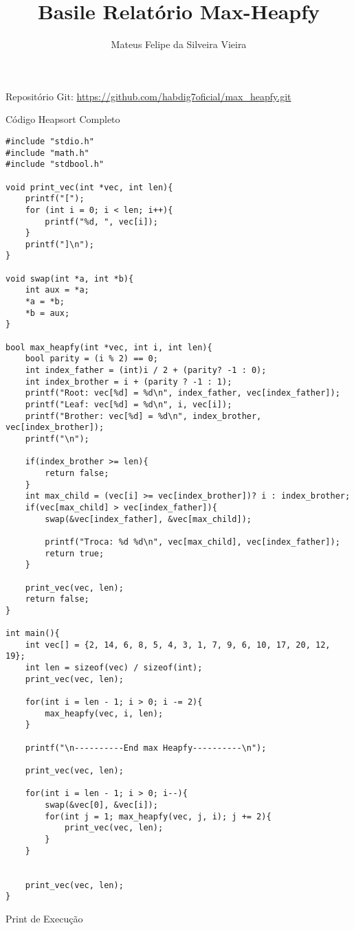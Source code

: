 \documentclass{article}
\title{Basile Relatório Max-Heapfy}
\author{Mateus Felipe da Silveira Vieira}
\begin{document}
    \maketitle

    \centerline{Repositório Git: \url{https://github.com/habdig7oficial/max_heapfy.git}}

    \vspace{0.9cm}

    \centerline{Código Heapsort Completo}

    \vspace{0.5cm}

    \begin{verbatim}
#include "stdio.h"
#include "math.h"
#include "stdbool.h"

void print_vec(int *vec, int len){
    printf("[");
    for (int i = 0; i < len; i++){
        printf("%d, ", vec[i]);
    }
    printf("]\n"); 
}

void swap(int *a, int *b){
    int aux = *a;
    *a = *b;
    *b = aux;
}

bool max_heapfy(int *vec, int i, int len){
    bool parity = (i % 2) == 0;
    int index_father = (int)i / 2 + (parity? -1 : 0);
    int index_brother = i + (parity ? -1 : 1);
    printf("Root: vec[%d] = %d\n", index_father, vec[index_father]);
    printf("Leaf: vec[%d] = %d\n", i, vec[i]);
    printf("Brother: vec[%d] = %d\n", index_brother, vec[index_brother]);
    printf("\n");

    if(index_brother >= len){
        return false;
    }
    int max_child = (vec[i] >= vec[index_brother])? i : index_brother;
    if(vec[max_child] > vec[index_father]){
        swap(&vec[index_father], &vec[max_child]);

        printf("Troca: %d %d\n", vec[max_child], vec[index_father]);
        return true;
    }

    print_vec(vec, len);
    return false;
}

int main(){
    int vec[] = {2, 14, 6, 8, 5, 4, 3, 1, 7, 9, 6, 10, 17, 20, 12, 19};
    int len = sizeof(vec) / sizeof(int);
    print_vec(vec, len);

    for(int i = len - 1; i > 0; i -= 2){
        max_heapfy(vec, i, len);
    }

    printf("\n----------End max Heapfy----------\n");

    print_vec(vec, len);

    for(int i = len - 1; i > 0; i--){
        swap(&vec[0], &vec[i]);
        for(int j = 1; max_heapfy(vec, j, i); j += 2){
            print_vec(vec, len);
        }
    }


    print_vec(vec, len);
}
    \end{verbatim}

    \vspace{0.9cm}

    \centerline{Print de Execução}

    \vspace{0.5cm}
\end{document}
